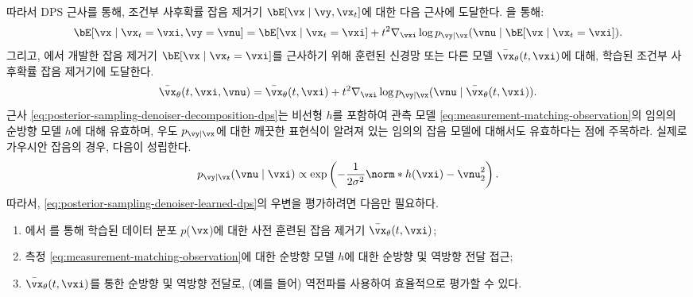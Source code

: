 \documentclass[../../book-main_ko.tex]{subfiles}
\begin{document}
따라서 DPS 근사를 통해, 조건부 사후확률 잡음 제거기 $\bE[\vx \mid \vy, \vx_t]$에 대한 다음 근사에 도달한다. 을 통해:
\begin{equation}
  \bE[ \vx \mid \vx_t=\vxi, \vy=\vnu]
  = 
  \bE[\vx \mid \vx_t=\vxi]
  + t^2 \nabla_{\vxi} \log p_{\vy \mid \vx}(\vnu \mid \bE[\vx \mid \vx_t = \vxi]).
  \label{eq:posterior-sampling-denoiser-decomposition-dps}
\end{equation}
그리고, 에서 개발한 잡음 제거기 $\bE[\vx \mid \vx_t = \vxi]$를 근사하기 위해 훈련된 신경망 또는 다른 모델 $\bar{\vx}_{\theta}(t, \vxi)$에 대해, 학습된 조건부 사후확률 잡음 제거기에 도달한다.
\begin{equation}
  \bar{\vx}_{\theta}(t, \vxi, \vnu)
  = \bar{\vx}_{\theta}(t, \vxi)
  + t^2 \nabla_{\vxi} \log p_{\vy \mid \vx}(\vnu \mid \bar{\vx}_{\theta}(t, \vxi)).
  \label{eq:posterior-sampling-denoiser-learned-dps}
\end{equation}
근사 \eqref{eq:posterior-sampling-denoiser-decomposition-dps}는 비선형 $h$를 포함하여 관측 모델 \eqref{eq:measurement-matching-observation}의 임의의 순방향 모델 $h$에 대해 유효하며, 우도 $p_{\vy \mid \vx}$에 대한 깨끗한 표현식이 알려져 있는 임의의 잡음 모델에 대해서도 유효하다는 점에 주목하라. 실제로 가우시안 잡음의 경우, 다음이 성립한다.
\begin{equation}
  p_{\vy \mid \vx}(\vnu \mid \vxi)
  \propto
  \exp\left(
    -\frac{1}{2\sigma^2} \norm*{ h(\vxi) - \vnu }_2^2
  \right).
\end{equation}
따라서, \eqref{eq:posterior-sampling-denoiser-learned-dps}의 우변을 평가하려면 다음만 필요하다.
\begin{enumerate}
  \item {}에서 를 통해 학습된 데이터 분포 $p$($\vx$)에 대한 사전 훈련된 잡음 제거기 $\bar{\vx}_{\theta}(t, \vxi)$;
  \item 측정 \eqref{eq:measurement-matching-observation}에 대한 순방향 모델 $h$에 대한 순방향 및 역방향 전달 접근;
  \item $\bar{\vx}_{\theta}(t, \vxi)$를 통한 순방향 및 역방향 전달로, (예를 들어) 역전파를 사용하여 효율적으로 평가할 수 있다.
\end{enumerate}
\end{document}
